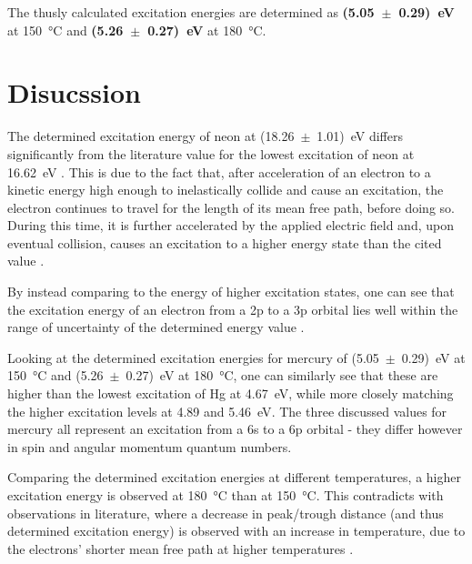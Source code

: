 \documentclass[titlepage]{article}
\begin{document}
The thusly calculated excitation energies are determined as \textbf{(5.05~\(\pm\)~0.29)~eV} at 150~°C and \textbf{(5.26~\(\pm\)~0.27)~eV} at 180~°C.

\newpage
\section{Disucssion}
The determined excitation energy of neon at (18.26~\(\pm\)~1.01)~eV differs significantly from the literature value for the lowest excitation of neon at 16.62~eV \autocite{Ne_Energies}. This is due to the fact that, after acceleration of an electron to a kinetic energy high enough to inelastically collide and cause an excitation, the electron continues to travel for the length of its mean free path, before doing so. During this time, it is further accelerated by the applied electric field and, upon eventual collision, causes an excitation to a higher energy state than the cited value \autocite{New_Features_of_FH_Exp}.

By instead comparing to the energy of higher excitation states, one can see that the excitation energy of an electron from a 2p to a 3p orbital lies well within the range of uncertainty of the determined energy value \autocite{Ne_Energies}.

Looking at the determined excitation energies for mercury of (5.05~\(\pm\)~0.29)~eV at 150~°C and (5.26~\(\pm\)~0.27)~eV at 180~°C, one can similarly see that these are higher than the lowest excitation of Hg at 4.67~eV, while more closely matching the higher excitation levels at 4.89 and 5.46~eV\autocite{Hg_Energies}. The three discussed values for mercury all represent an excitation from a 6s to a 6p orbital - they differ however in spin and angular momentum quantum numbers.

Comparing the determined excitation energies at different temperatures, a higher excitation energy is observed at 180~°C than at 150~°C. This contradicts with observations in literature, where a decrease in peak/trough distance (and thus determined excitation energy) is observed with an increase in temperature, due to the electrons' shorter mean free path at higher temperatures \autocite{New_Features_of_FH_Exp}.
\end{document}
